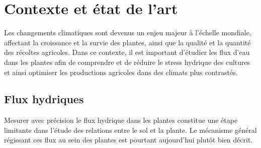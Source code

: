 \section{Contexte et état de l'art}

Les changements climatiques sont devenus un enjeu majeur à l'échelle mondiale, affectant la croissance et la survie des plantes, ainsi que la qualité et la quantité des récoltes agricoles.
Dans ce contexte, il est important d'étudier les flux d'eau dans les plantes afin de comprendre et de réduire le stress hydrique des cultures et ainsi optimiser les productions agricoles dans des climats plus contrastés.

\subsection{Flux hydriques}

Mesurer avec précision le flux hydrique dans les plantes constitue une étape limitante dans l'étude des relations entre le sol et la plante.
Le mécanisme général régissant ces flux au sein des plantes est pourtant aujourd'hui plutôt bien décrit.
\vspace{0.5 cm}

